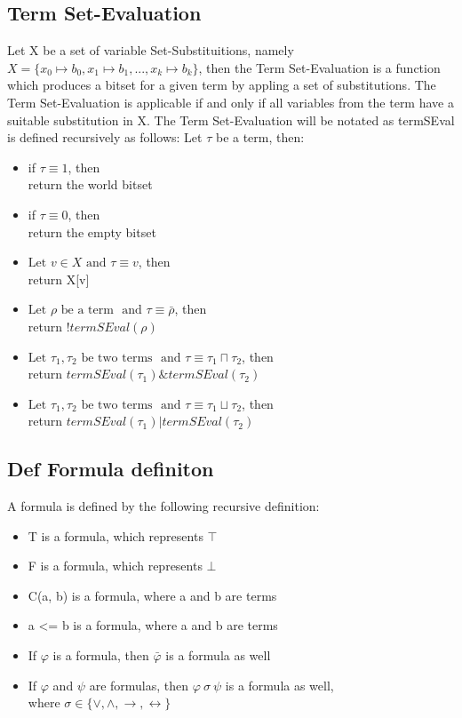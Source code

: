 \documentclass{article}
\begin{document}
		\subsection*{Term Set-Evaluation}
			Let X be a set of variable Set-Substituitions, namely $ X = \{ x_0 \longmapsto b_0, x_1 \longmapsto b_1, ..., x_k \longmapsto b_k \}$,
			then the Term Set-Evaluation is a function which produces a bitset for a given term by appling a set of substitutions.
			The Term Set-Evaluation is applicable if and only if all variables from the term have a suitable substitution in X.
			\newline
			\newline
			The Term Set-Evaluation will be notated as termSEval is defined recursively as follows:
			\newline
			Let $\tau$ be a term, then:
			\begin{itemize}
				\item if $\tau \equiv 1$, then \\
					return the world bitset
				\item if $\tau \equiv 0$, then \\
					return the empty bitset
				\item $\text{Let } v \in X \text{ and } \tau \equiv v$, then \\
					return X[v]
				\item $\text{Let } \rho \text{ be a term } \text{ and } \tau \equiv \bar{\rho}$, then \\
					return $!termSEval(\rho)$
				\item $\text{Let } \tau_1, \tau_2 \text{ be two terms } \text{ and } \tau \equiv \tau_1 \sqcap \tau_2$, then \\
					return $termSEval(\tau_1) \& termSEval(\tau_2)$
				\item $\text{Let } \tau_1, \tau_2 \text{ be two terms } \text{ and } \tau \equiv \tau_1 \sqcup \tau_2$, then \\
					return $termSEval(\tau_1) | termSEval(\tau_2)$
			\end{itemize}
				
	\subsection*{Def Formula definiton}
		A formula is defined by the following recursive definition:
		\begin{itemize}
			\item T is a formula, which represents $\top$
			\item F is a formula, which represents $\bot$
			\item C(a, b) is a formula, where a and b are terms
			\item a <= b is a formula, where a and b are terms
			\item If $\varphi$ is a formula, then $\bar{\varphi}$ is a formula as well
			\item If $\varphi$ and $\psi$ are formulas, then $\varphi \: \sigma \: \psi $ is a formula as well,\\
				where $\sigma \in \{\vee, \wedge, \rightarrow, \leftrightarrow\}$
		\end{itemize}
	
\end{document}
